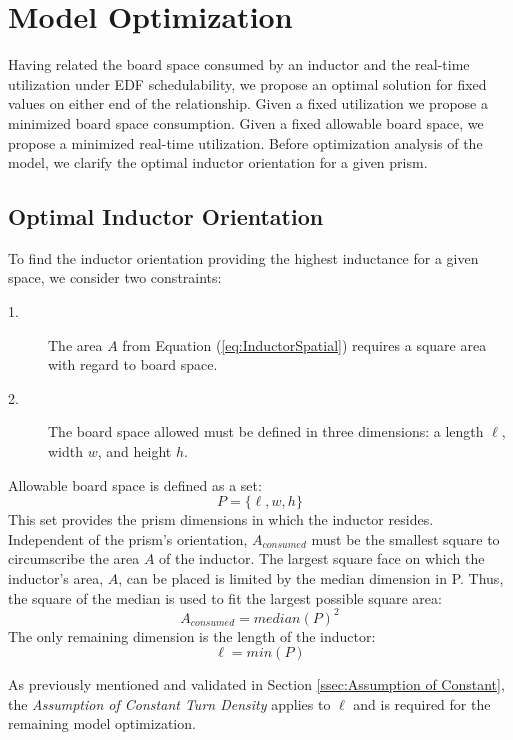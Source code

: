 \documentclass[11pt,compsoc,oneside]{report}
\begin{document}
\chapter{Model Optimization}\label{chap:model optimization}
Having related the board space consumed by an inductor and the real-time utilization under EDF schedulability, we propose an optimal solution for fixed values on either end of the relationship. Given a fixed utilization we propose a minimized board space consumption. Given a fixed allowable board space, we propose a minimized real-time utilization. Before optimization analysis of the model, we clarify the optimal inductor orientation for a given prism.

\section{Optimal Inductor Orientation}
To find the inductor orientation providing the highest inductance for a given space, we consider two constraints:
\begin{description}
\item [1.] The area $A$ from Equation (\ref{eq:InductorSpatial}) requires a square area with regard to board space.
\item [2.] The board space allowed must be defined in three dimensions: a length $\ell$, width $w$, and height $h$.
\end{description}

Allowable board space is defined as a set:
\begin{equation}\label{eq:Prism}
P = \{\ell,w,h\}
\end{equation}
This set provides the prism dimensions in which the inductor resides. Independent of the prism's orientation, $A_{consumed}$ must be the smallest square to circumscribe the area $A$ of the inductor. The largest square face on which the inductor's area, $A$, can be placed is limited by the median dimension in P. Thus, the square of the median is used to fit the largest possible square area:
\begin{equation}\label{eq:PrismAreaConsumed}
A_{consumed} = median(P)^2
\end{equation}
The only remaining dimension is the length of the inductor:
\begin{equation}\label{eq:PrismLength}
\ell = min(P)
\end{equation}

As previously mentioned and validated in Section \ref{ssec:Assumption of Constant}, the \textit{Assumption of Constant Turn Density} applies to $\ell$ and is required for the remaining model optimization.
\end{document}
